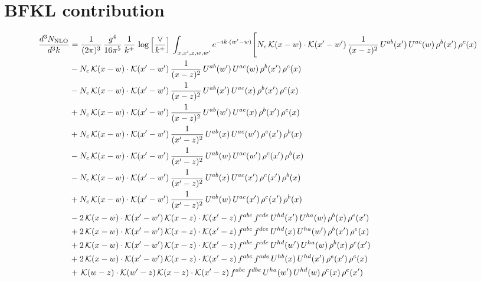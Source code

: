 \documentclass[9pt]{article}
\numberwithin{equation}{section}
\begin{document}
\section{BFKL contribution}
\begin{align}
    \frac{d^{3}N_{\mathrm{NLO}}}{d^{3}k} & = \frac{1}{(2\pi)^{3}}\,\frac{g^{4}}{16\pi^{5}}\,\frac{1}{k^{+}}\,\log\Big[\frac{\vee}{k^{+}}\Big]\,\int_{x,x',z,w,w'}e^{-ik\cdot(w'-w)}\Bigg[N_{c}\,\mathcal{K}(x-w)\cdot\mathcal{K}(x'-w')\,\frac{1}{(x-z)^{2}}\,U^{ab}(x')\,U^{ac}(w)\,\rho^{b}(x')\,\rho^{c}(x)\notag\\
&-N_{c}\,\mathcal{K}(x-w)\cdot\mathcal{K}(x'-w')\,\frac{1}{(x-z)^{2}}\,U^{ab}(w')\,U^{ac}(w)\,\rho^{b}(x')\,\rho^{c}(x)\notag\\
&-N_{c}\,\mathcal{K}(x-w)\cdot\mathcal{K}(x'-w')\,\frac{1}{(x-z)^{2}}\,U^{ab}(x')\,U^{ac}(x)\,\rho^{b}(x')\,\rho^{c}(x)\notag\\
&+N_{c}\,\mathcal{K}(x-w)\cdot\mathcal{K}(x'-w')\,\frac{1}{(x-z)^{2}}\,U^{ab}(w')\,U^{ac}(x)\,\rho^{b}(x')\,\rho^{c}(x)\notag\\
&+N_{c}\,\mathcal{K}(x-w)\cdot\mathcal{K}(x'-w')\,\frac{1}{(x'-z)^{2}}\,U^{ab}(x)\,U^{ac}(w')\,\rho^{c}(x')\,\rho^{b}(x)\notag\\
&-N_{c}\,\mathcal{K}(x-w)\cdot\mathcal{K}(x'-w')\,\frac{1}{(x'-z)^{2}}\,U^{ab}(w)\,U^{ac}(w')\,\rho^{c}(x')\,\rho^{b}(x)\notag\\
&-N_{c}\,\mathcal{K}(x-w)\cdot\mathcal{K}(x'-w')\,\frac{1}{(x'-z)^{2}}\,U^{ab}(x)\,U^{ac}(x')\,\rho^{c}(x')\,\rho^{b}(x)\notag\\
&+N_{c}\,\mathcal{K}(x-w)\cdot\mathcal{K}(x'-w')\,\frac{1}{(x'-z)^{2}}\,U^{ab}(w)\,U^{ac}(x')\,\rho^{c}(x')\,\rho^{b}(x)\notag\\
&-2\,\mathcal{K}(x-w)\cdot\mathcal{K}(x'-w')\,\mathcal{K}(x-z)\cdot\mathcal{K}(x'-z)\,f^{abc}\,f^{cde}\,U^{hd}(x')\,U^{ha}(w)\,\rho^{b}(x)\,\rho^{e}(x')\notag\\
&+2\,\mathcal{K}(x-w)\cdot\mathcal{K}(x'-w')\,\mathcal{K}(x-z)\cdot\mathcal{K}(x'-z)\,f^{abc}\,f^{dce}\,U^{hd}(x)\,U^{ha}(w')\,\rho^{b}(x')\,\rho^{e}(x)\notag\\
&+2\,\mathcal{K}(x-w)\cdot\mathcal{K}(x'-w')\,\mathcal{K}(x-z)\cdot\mathcal{K}(x'-z)\,f^{abc}\,f^{cde}\,U^{hd}(w')\,U^{ha}(w)\,\rho^{b}(x)\,\rho^{e}(x')\notag\\
&+2\,\mathcal{K}(x-w)\cdot\mathcal{K}(x'-w')\,\mathcal{K}(x-z)\cdot\mathcal{K}(x'-z)\,f^{abc}\,f^{ade}\,U^{hb}(x)\,U^{hd}(x')\,\rho^{e}(x')\,\rho^{c}(x)\notag\\
&+\,\mathcal{K}(w-z)\cdot\mathcal{K}(w'-z)\,\mathcal{K}(x-z)\cdot\mathcal{K}(x'-z)\,f^{abc}\,f^{dbe}\,U^{ha}(w')\,U^{hd}(w)\,\rho^{c}(x)\,\rho^{e}(x')\notag\\

\end{align}
\end{document}
